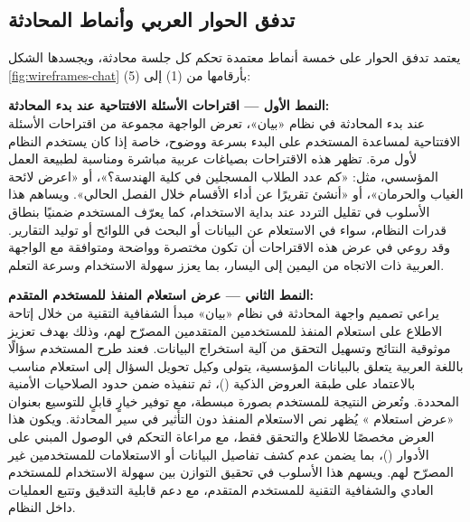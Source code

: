 \subsection{تدفق الحوار العربي وأنماط المحادثة}
\label{subsec:ui-conversation}

يعتمد تدفق الحوار على خمسة أنماط معتمدة تحكم كل جلسة محادثة، ويجسدها الشكل \ref{fig:wireframes-chat} بأرقامها من (1) إلى (5):

\textbf{النمط الأول — اقتراحات الأسئلة الافتتاحية عند بدء المحادثة:}\\
عند بدء المحادثة في نظام «بيان»، تعرض الواجهة مجموعة من اقتراحات الأسئلة الافتتاحية لمساعدة المستخدم على البدء بسرعة ووضوح، خاصة إذا كان يستخدم النظام لأول مرة. تظهر هذه الاقتراحات بصياغات عربية مباشرة ومناسبة لطبيعة العمل المؤسسي، مثل: «كم عدد الطلاب المسجلين في كلية الهندسة؟»، أو «اعرض لائحة الغياب والحرمان»، أو «أنشئ تقريرًا عن أداء الأقسام خلال الفصل الحالي». ويساهم هذا الأسلوب في تقليل التردد عند بداية الاستخدام، كما يعرّف المستخدم ضمنيًا بنطاق قدرات النظام، سواء في الاستعلام عن البيانات أو البحث في اللوائح أو توليد التقارير. وقد روعي في عرض هذه الاقتراحات أن تكون مختصرة وواضحة ومتوافقة مع الواجهة العربية ذات الاتجاه من اليمين إلى اليسار، بما يعزز سهولة الاستخدام وسرعة التعلم.

\textbf{النمط الثاني — عرض استعلام  المنفذ للمستخدم المتقدم:}\\
يراعي تصميم واجهة المحادثة في نظام «بيان» مبدأ الشفافية التقنية من خلال إتاحة الاطلاع على استعلام  المنفذ للمستخدمين المتقدمين المصرّح لهم، وذلك بهدف تعزيز موثوقية النتائج وتسهيل التحقق من آلية استخراج البيانات. فعند طرح المستخدم سؤالًا باللغة العربية يتعلق بالبيانات المؤسسية، يتولى وكيل  تحويل السؤال إلى استعلام مناسب بالاعتماد على طبقة العروض الذكية ()، ثم تنفيذه ضمن حدود الصلاحيات الأمنية المحددة. وتُعرض النتيجة للمستخدم بصورة مبسطة، مع توفير خيارٍ قابلٍ للتوسيع بعنوان «عرض استعلام » يُظهر نص الاستعلام المنفذ دون التأثير في سير المحادثة. ويكون هذا العرض مخصصًا للاطلاع والتحقق فقط، مع مراعاة التحكم في الوصول المبني على الأدوار ()، بما يضمن عدم كشف تفاصيل البيانات أو الاستعلامات للمستخدمين غير المصرّح لهم. ويسهم هذا الأسلوب في تحقيق التوازن بين سهولة الاستخدام للمستخدم العادي والشفافية التقنية للمستخدم المتقدم، مع دعم قابلية التدقيق وتتبع العمليات داخل النظام.

